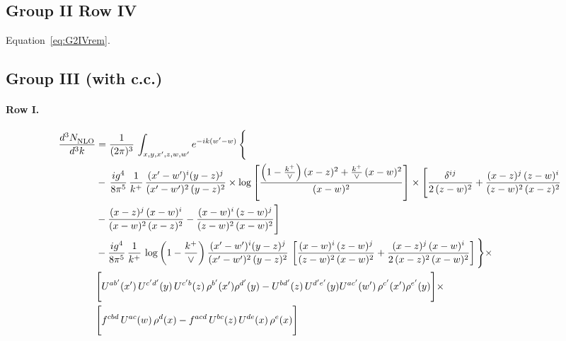\documentclass[10pt]{article}
\numberwithin{equation}{section}
\begin{document}
\subsection{Group II Row IV}
Equation~\eqref{eq:G2IVrem}.

\subsection{Group III (with c.c.)}\label{sub:G3}
\paragraph{Row I.}
\begin{align}
     \frac{d^{3}N_{\rm NLO}^{\rm}}{d^{3}k}  & =   \frac{1}{(2\pi)^{3}}\, \int_{x,y,x',z,w,w^{\prime}} e^{-ik(w^{\prime}-w)}\, \Bigg\{\notag \\
& -\,\frac{ig^{4}}{8\pi^{5}}\,\frac{1}{k^{+}}\,\frac{(x'-w')^{i}(y-z)^{j}}{(x'-w')^{2}\,(y-z)^{2}}\times \log{\left[\frac{\left(1-\frac{k^{+}}{\vee}\right)(x-z)^{2}+\frac{k^{+}}{\vee}\,(x-w)^{2}}{(x-w)^{2}}\right]}\times \Bigg[\frac{\delta^{ij}}{2\,(z-w)^{2}}+\frac{(x-z)^{j}\,(z-w)^{i}}{(z-w)^{2}\,(x-z)^{2}}\notag \\ & -\frac{(x-z)^{j}\,(x-w)^{i}}{(x-w)^{2}\,(x-z)^{2}}-\frac{(x-w)^{i}\,(z-w)^{j}}{(z-w)^{2}\,(x-w)^{2}}\Bigg] \notag \\
& -\frac{ig^{4}}{8\pi^{5}}\,\frac{1}{k^{+}}\,\log{\left(1-\frac{k^{+}}{\vee}\right)}\,\frac{(x'-w')^{i}(y-z)^{j}}{(x'-w')^{2}\,(y-z)^{2}}\,\left[\frac{(x-w)^{i}\,(z-w)^{j}}{(z-w)^{2}\,(x-w)^{2}}+\frac{(x-z)^{j}\,(x-w)^{i}}{2\,(x-z)^{2}\, (x-w)^{2}}\right]\Bigg\}\times \notag \\ &  \Bigg[U^{ab'}(x')\,U^{c'd'}(y)\,U^{c'b}(z)\,\rho^{b'}(x')\rho^{d'}(y)-U^{bd'}(z)\,U^{d'e'}(y)U^{ac'}(w')\,\rho^{c'}(x')\rho^{e'}(y)\Bigg]\times\notag \\ & \Bigg[f^{cbd}\,U^{ac}(w)\,\rho^{d}(x)-f^{acd}\, U^{bc}(z)\,U^{de}(x)\,\rho^{e}(x)\Bigg]
\end{align}
\end{document}
